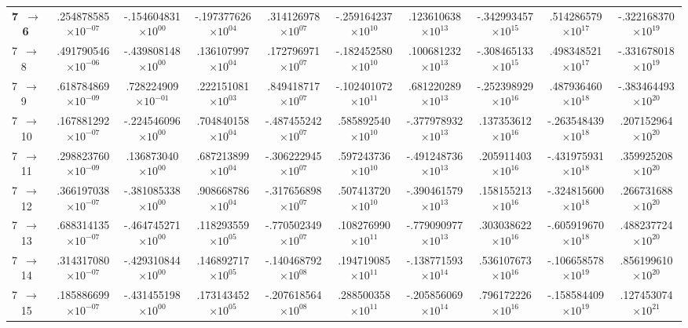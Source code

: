 \documentclass[reviewcopy]{elsarticle}
\begin{document}
\begin{landscape}
\begin{longtable}{lccccccccc}
{\bf 7~$\to$~ 6}  &  .254878585$\times10^{-07}$ & -.154604831$\times10^{00}$ & -.197377626$\times10^{04}$ &  .314126978$\times10^{07}$ & -.259164237$\times10^{10}$ &  .123610638$\times10^{13}$ & -.342993457$\times10^{15}$ &  .514286579$\times10^{17}$ & -.322168370$\times10^{19}$ \\
 7~$\to$~ 8  &  .491790546$\times10^{-06}$ & -.439808148$\times10^{00}$ &  .136107997$\times10^{04}$ &  .172796971$\times10^{07}$ & -.182452580$\times10^{10}$ &  .100681232$\times10^{13}$ & -.308465133$\times10^{15}$ &  .498348521$\times10^{17}$ & -.331678018$\times10^{19}$ \\
 7~$\to$~ 9  &  .618784869$\times10^{-09}$ &  .728224909$\times10^{-01}$ &  .222151081$\times10^{03}$ &  .849418717$\times10^{07}$ & -.102401072$\times10^{11}$ &  .681220289$\times10^{13}$ & -.252398929$\times10^{16}$ &  .487936460$\times10^{18}$ & -.383464493$\times10^{20}$ \\
 7~$\to$~ 10 &  .167881292$\times10^{-07}$ & -.224546096$\times10^{00}$ &  .704840158$\times10^{04}$ & -.487455242$\times10^{07}$ &  .585892540$\times10^{10}$ & -.377978932$\times10^{13}$ &  .137353612$\times10^{16}$ & -.263548439$\times10^{18}$ &  .207152964$\times10^{20}$ \\
 7~$\to$~ 11 &  .298823760$\times10^{-09}$ &  .136873040$\times10^{00}$ &  .687213899$\times10^{04}$ & -.306222945$\times10^{07}$ &  .597243736$\times10^{10}$ & -.491248736$\times10^{13}$ &  .205911403$\times10^{16}$ & -.431975931$\times10^{18}$ &  .359925208$\times10^{20}$ \\
 7~$\to$~ 12 &  .366197038$\times10^{-07}$ & -.381085338$\times10^{00}$ &  .908668786$\times10^{04}$ & -.317656898$\times10^{07}$ &  .507413720$\times10^{10}$ & -.390461579$\times10^{13}$ &  .158155213$\times10^{16}$ & -.324815600$\times10^{18}$ &  .266731688$\times10^{20}$ \\
 7~$\to$~ 13 &  .688314135$\times10^{-07}$ & -.464745271$\times10^{00}$ &  .118293559$\times10^{05}$ & -.770502349$\times10^{07}$ &  .108276990$\times10^{11}$ & -.779090977$\times10^{13}$ &  .303038622$\times10^{16}$ & -.605919670$\times10^{18}$ &  .488237724$\times10^{20}$ \\
 7~$\to$~ 14 &  .314317080$\times10^{-07}$ & -.429310844$\times10^{00}$ &  .146892717$\times10^{05}$ & -.140468792$\times10^{08}$ &  .194719085$\times10^{11}$ & -.138771593$\times10^{14}$ &  .536107673$\times10^{16}$ & -.106658578$\times10^{19}$ &  .856199610$\times10^{20}$ \\
 7~$\to$~ 15 &  .185886699$\times10^{-07}$ & -.431455198$\times10^{00}$ &  .173143452$\times10^{05}$ & -.207618564$\times10^{08}$ &  .288500358$\times10^{11}$ & -.205856069$\times10^{14}$ &  .796172226$\times10^{16}$ & -.158584409$\times10^{19}$ &  .127453074$\times10^{21}$ \\

\end{longtable}
\end{landscape}
\end{document}
